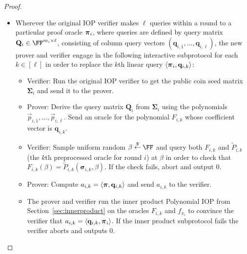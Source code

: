 \begin{proof}
\begin{itemize}
\item Wherever the original IOP verifier makes $\ell$ queries within a round to a particular proof oracle $\boldsymbol{\pi}_i$, where queries are defined by query matrix $\mathbf{Q}_i \in \FF^{m_i \times \ell}$, consisting of column query vectors $(\mathbf{q}_{i,1},...,\mathbf{q}_{i,\ell})$, the new prover and verifier engage in the following interactive subprotocol for each $k \in [\ell]$ in order to replace the $k$th linear query $\langle \boldsymbol{\pi}_i, \mathbf{q}_{i,k} \rangle$: 

\begin{itemize}[nolistsep]
\item Verifier: Run the original IOP verifier to get the public coin seed matrix $\boldsymbol{\Sigma}_i$ and send it to the prover.
 \item Prover: Derive the query matrix $\mathbf{Q}_i$ from $\boldsymbol{\Sigma}_i$ using the polynomials $\vec{p}_{i,1}, \ldots, \vec{p}_{i, \ell}$. Send an oracle for the polynomial $F_{i,k}$ whose coefficient vector is $\mathbf{q}_{i,k}$. 
 \item Verifier: Sample uniform random $\beta \sample \FF$ and query both $F_{i,k}$ and $\tilde{P}_{i,k}$ (the $k$th preprocessed oracle for round $i$) at $\beta$ in order to check that $F_{i,k} (\beta) = \tilde{P}_{i,k}(\boldsymbol{\sigma}_{i,k}, \beta)$. If the check fails, abort and output 0.
 
 
 \item Prover: Compute $a_{i,k} = \langle \boldsymbol{\pi}, \mathbf{q}_{i,k} \rangle$ and send $a_{i,k}$ to the verifier. 
 
 \item The prover and verifier run the inner product Polynomial IOP from Section~\ref{sec:innerproduct} on the oracles $F_{i,k}$ and $f_{\pi_i}$ to convince the verifier that $a_{i,k} = \langle \mathbf{q}_{i,k}, \boldsymbol{\pi}_i \rangle$. If the inner product subprotocol fails the verifier aborts and outputs 0.  
 \end{itemize}
 

\end{itemize}
\end{proof}
